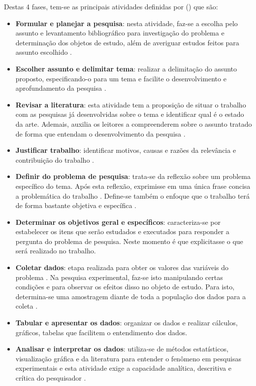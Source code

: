Destas 4 fases, tem-se as principais atividades definidas por \citeauthor{PRODANOV2013} (\citeyear{PRODANOV2013}) que são:

\begin{itemize}
  \item \textbf{Formular e planejar a pesquisa}: nesta atividade, faz-se a escolha pelo assunto e levantamento bibliográfico para investigação do problema e determinação dos objetos de estudo, além de averiguar estudos feitos para assunto escolhido \cite{PRODANOV2013}.
  \item \textbf{Escolher assunto e delimitar tema}: realizar a delimitação do assunto proposto, especificando-o para um tema e facilite o desenvolvimento e aprofundamento da pesquisa \cite{PRODANOV2013}.
  \item \textbf{Revisar a literatura}: esta atividade tem a proposição de situar o trabalho com as pesquisas já desenvolvidas sobre o tema e identificar qual é o estado da arte. Ademais, auxilia os leitores a compreenderem sobre o assunto tratado de forma que entendam o desenvolvimento da pesquisa \cite{PRODANOV2013}.
  \item \textbf{Justificar trabalho}: identificar motivos, causas e razões da relevância e contribuição do trabalho \cite{PRODANOV2013}.
  \item \textbf{Definir do problema de pesquisa}: trata-se da reflexão sobre um problema específico do tema. Após esta reflexão, exprimisse em uma única frase concisa a problemática do trabalho \cite{PRODANOV2013}. Define-se também o enfoque que o trabalho terá de forma bastante objetiva e específica \cite{GIL2002}.
  \item \textbf{Determinar os objetivos geral e específicos}: caracteriza-se por estabelecer os itens que serão estudados e executados para responder a pergunta do problema de pesquisa. Neste momento é que explicitasse o que será realizado no trabalho.
  \item \textbf{Coletar dados}: etapa realizada para obter os valores das variáveis do problema \cite{PRODANOV2013}. Na pesquisa experimental, faz-se isto manipulando certas condições e para observar os efeitos disso no objeto de estudo. Para isto, determina-se uma amostragem diante de toda a população dos dados para a coleta \cite{GIL2002}.
  \item \textbf{Tabular e apresentar os dados}: organizar os dados e realizar cálculos, gráficos, tabelas que facilitem o entendimento dos dados.
  \item \textbf{Analisar e interpretar os dados}: utiliza-se de métodos estatísticos, visualização gráfica e da literatura para entender o fenômeno em pesquisas experimentais \cite{GIL2002} e esta atividade exige a capacidade analítica, descritiva e crítica do pesquisador \cite{PRODANOV2013}.   

\end{itemize}
